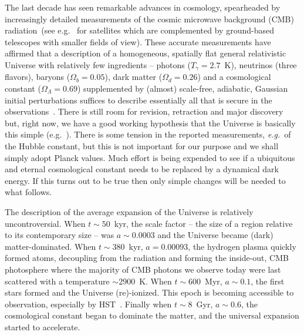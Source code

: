 \documentclass[psfig,12pt]{article}
\def\eg{{\it e.g.}\ }
\def\ni{\noindent}
\begin{document}
\ni{\bf Our Universe's Contents:}
The last decade has seen remarkable advances in cosmology, spearheaded
by increasingly detailed measurements of the cosmic microwave background
(CMB) radiation~(see e.g.~\cite{WMAP2013maps, WMAP2013cosmopara, Planck2015maps, Planck2015cosmopara} for satellites which are complemented by ground-based telescopes with smaller fields of view).
These accurate measurements have affirmed that a description of a
homogeneous, spatially flat general relativistic Universe with
relatively few ingredients -- photons ($T_\gamma=2.7$~K), neutrinos
(three flavors), baryons ($\Omega_b=0.05$), dark matter
($\Omega_d=0.26$) and a cosmological constant ($\Omega_\Lambda=0.69$)
supplemented by (almost) scale-free, adiabatic, Gaussian initial
perturbations suffices to describe essentially all that is secure in the
observations~\cite{Planck2015cosmopara}. There is still room for
revision, retraction and major discovery but, right now, we have a good
working hypothesis that the Universe is basically this simple
(e.g.~\cite{Weinberg2008, Schneider2015}). There is some tension in the
reported measurements, \eg of the Hubble constant, but this is not
important for our purpose and we shall simply adopt Planck values. Much
effort is being expended to see if a ubiquitous and eternal cosmological
constant needs to be replaced by a dynamical dark energy. If this turns
out to be true then only simple changes will be needed to what follows.

\ni{\bf Our Universe's Evolution:}
The description of the average expansion of the Universe is relatively
uncontroversial. When  $t\sim 50$~kyr,  the scale factor -- the size of
a region relative to its contemporary size -- was $a\sim0.0003$ and the
Universe became (dark) matter-dominated. When $t\sim380$~kyr,
$a=0.00093$, the hydrogen plasma quickly formed atoms, decoupling from
the radiation and forming the inside-out, CMB photosphere where the
majority of CMB photons we observe today were last scattered with a
temperature $\sim2900$~K. When $t\sim600$~Myr, $a\sim0.1$, the first
stars formed and the Universe (re)-ionized. This epoch is becoming
accessible to observation, especially by HST~\cite{Castellano2016}. Finally when $t\sim8$~Gyr, $a\sim0.6$, the
cosmological constant began to dominate the matter, and the universal
expansion started to accelerate.
\end{document}
